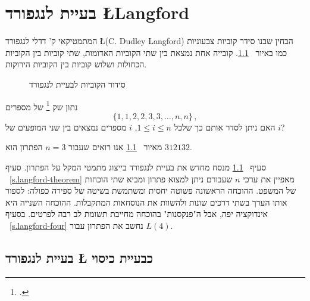 
\chapter%
[הבעיה של 
\L{\normalsize Langford}]%
{בעיית לנגפורד
\L{\Large Langford}}
\label{c.langford}

המתמטיקאי ק' דדלי לנגפורד
\L{(C. Dudley Langford)}
הבחין שבנו סידר קוביות צבעוניות כמו באיור%
~\ref{f.langford}.
קובייה אחת נמצאת בין שתי הקוביות האדומות, שתי קוביות בין הקוביות הכחולות ושלוש קוביות בין הקוביות הירוקות.  
\begin{figure}[h]
\begin{center}
\end{center}
\caption{סידור הקוביות לבעיית לנגפורד} \label{f.langford}
\end{figure}

\begin{definition}
נתון שק%
\footnote{.} 
של מספרים
\[
\{1,1,2,2,3,3,\ldots,n,n\}\,,
\]
האם ניתן לסדר אותם כך שלכל
$1\leq i \leq n$, $i$
מספרים נמצאים בין שני המופעים של
$i$?
\end{definition}
מאיור%
~\ref{f.langford}
אנו רואים שעבור 
$n=3$
הפתרון הוא
$312132$.

סעיף%
~\ref{s.langford-covering} 
מנסח מחדש את בעיית לנגפורד
בייצוג מתמטי המקל על הפתרון. סעיף%
~\ref{s.langford-theorem}
מאפיין את ערכי
$n$
שעבורם ניתן למצוא פתרון ומביא שתי הוכחות של המשפט. ההוכחה הראשונה פשוטה יחסית ומשתמשת בשיטה של ספירה כפולה: לספור אותו הערך בשתי דרכים שונות ולהשוות את הנוסחאות המתקבלות. ההוכחה השנייה היא אינדוקציה יפה, אבל ה"פנקסנות" בהוכחה מחייבת תשומת לב רבה לפרטים. בסעיף%
~\ref{s.langford-four}
נחשב את הפתרון עבור
$L(4)$.


\section{בעיית לנגפורד
\L{\normalsize }
כבעיית כיסוי}
\label{s.langford-covering}

